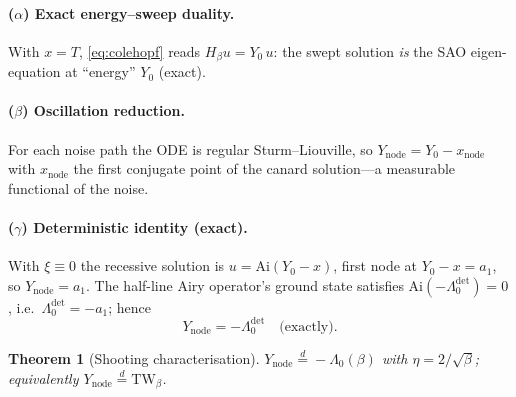\documentclass[11pt]{article}
\newtheorem{theorem}{Theorem}
\theoremstyle{remark}
\newcommand{\Ynode}{Y_{\mathrm{node}}}
\newcommand{\TW}{\mathrm{TW}}
\newcommand{\Lamdet}{\Lambda_0^{\mathrm{det}}}
\newcommand{\eqd}{\stackrel{d}{=}}
\begin{document}
\paragraph{($\alpha$) Exact energy--sweep duality.} With $x=T$,
\eqref{eq:colehopf} reads $H_\beta u=Y_0\,u$: the swept solution \emph{is} the SAO
eigen-equation at ``energy'' $Y_0$ (exact).

\paragraph{($\beta$) Oscillation reduction.} For each noise path the ODE is regular
Sturm--Liouville, so $\Ynode=Y_0-x_{\mathrm{node}}$ with $x_{\mathrm{node}}$ the first
conjugate point of the canard solution---a measurable functional of the noise.

\paragraph{($\gamma$) Deterministic identity (exact).} With $\xi\equiv0$ the recessive
solution is $u=\mathrm{Ai}(Y_0-x)$, first node at $Y_0-x=a_1$, so $\Ynode=a_1$. The
half-line Airy operator's ground state satisfies $\mathrm{Ai}(-\Lamdet)=0$, i.e.\
$\Lamdet=-a_1$; hence
\begin{equation}\label{eq:detmatch}
  \Ynode=-\Lamdet \quad\text{(exactly).}
\end{equation}

\begin{theorem}[Shooting characterisation]\label{thm:shoot}
$\Ynode\eqd-\Lambda_0(\beta)$ with $\eta=2/\sqrt\beta$; equivalently
$\Ynode\eqd\TW_\beta$.
\end{theorem}
\end{document}
